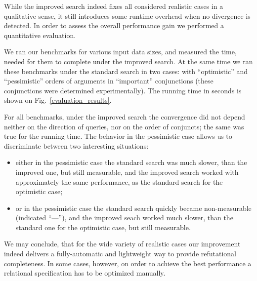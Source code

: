 While the improved search indeed fixes all considered realistic cases in a qualitative sense, it still introduces some runtime
overhead when no divergence is detected. In order to assess the overall performance gain we performed a quantitative
evaluation.

We ran our benchmarks for various input data sizes, and measured the time, needed for them to complete under the improved search. At the same time
we ran these benchmarks under the standard search in two cases: with ``optimistic'' and ``pessimistic'' orders of arguments in ``important'' conjunctions
(these conjunctions were determined experimentally). The running time in seconds is shown on Fig.~\ref{evaluation_results}.

For all benchmarks, under the improved search the convergence did not depend neither on the direction of queries, nor on the order of conjuncts; the same was true for
the running time. The behavior in the pessimistic case allows us to discriminate between two interesting situations:

\begin{itemize}
\item either in the pessimistic case the standard search was much slower, than the improved one, but still measurable, and the improved search worked with approximately the
same performance, as the standard search for the optimistic case;
  
\item or in the pessimistic case the standard search quickly became non-measurable (indicated ``---''), and the improved seach worked much slower, than the standard one for the
optimistic case, but still measurable.
\end{itemize}

We may conclude, that for the wide variety of realistic cases our improvement indeed delivers a fully-automatic and lightweight way to provide refutational completeness. In some cases,
however, on order to achieve the best performance a relational specification has to be optimized manually.

